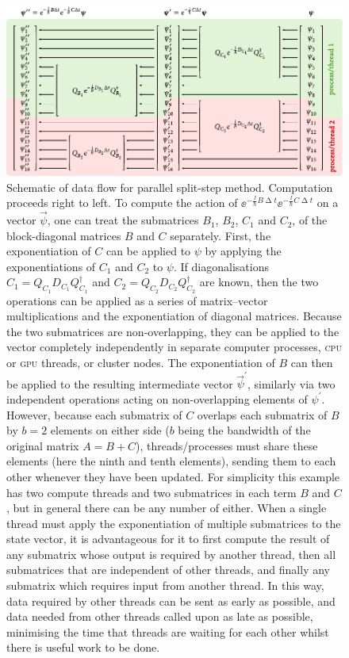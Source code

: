 \begin{figure}[t]
    \centerfloat
    \includegraphics[width=\textwidth]{figures/numerics/parallel_split_step.pdf}
    \caption{Schematic of data flow for parallel split-step method. Computation proceeds right to left. To compute the action of $\ee^{-\frac\ii\hbar B\upDelta t}\ee^{-\frac\ii\hbar C\upDelta t}$ on a vector $\vec\psi$, one can treat the submatrices $B_1$, $B_2$, $C_1$ and $C_2$, of the block-diagonal matrices $B$ and $C$ separately. First, the exponentiation of $C$ can be applied to $\psi$ by applying the exponentiations of $C_1$ and $C_2$ to $\psi$. If diagonalisations $C_1 = Q_{C_1} D_{C_1} Q^\dagger_{C_1}$ and $C_2 = Q_{C_2} D_{C_2} Q^\dagger_{C_2}$ are known, then the two operations can be applied as a series of matrix--vector multiplications and the exponentiation of diagonal matrices. Because the two submatrices are non-overlapping, they can be applied to the vector completely independently in separate computer processes, \textsc{cpu} or \textsc{gpu} threads, or cluster nodes. The exponentiation of $B$ can then be applied to the resulting intermediate vector $\vec\psi^\prime$, similarly via two independent operations acting on non-overlapping elements of $\psi^\prime$. However, because each submatrix of $C$ overlaps each submatrix of $B$ by $b=2$ elements on either side ($b$ being the bandwidth of the original matrix $A=B+C$), threads/processes must share these elements (here the ninth and tenth elements), sending them to each other whenever they have been updated. For simplicity this example has two compute threads and two submatrices in each term $B$ and $C$, but in general there can be any number of either. When a single thread must apply the exponentiation of multiple submatrices to the state vector, it is advantageous for it to first compute the result of any submatrix whose output is required by another thread, then all submatrices that are independent of other threads, and finally any submatrix which requires input from another thread. In this way, data required by other threads can be sent as early as possible, and data needed from other threads called upon as late as possible, minimising the time that threads are waiting for each other whilst there is useful work to be done.}
    \label{fig:parallel_split_step}
\end{figure}

